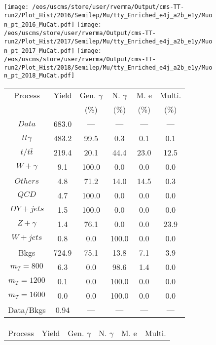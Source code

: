\begin{figure}
\centering
\texttt{[image: /eos/uscms/store/user/rverma/Output/cms-TT-run2/Plot\_Hist/2016/Semilep/Mu/tty\_Enriched\_e4j\_a2b\_e1y/Muon\_pt\_2016\_MuCat.pdf]}
\texttt{[image: /eos/uscms/store/user/rverma/Output/cms-TT-run2/Plot\_Hist/2017/Semilep/Mu/tty\_Enriched\_e4j\_a2b\_e1y/Muon\_pt\_2017\_MuCat.pdf]}
\texttt{[image: /eos/uscms/store/user/rverma/Output/cms-TT-run2/Plot\_Hist/2018/Semilep/Mu/tty\_Enriched\_e4j\_a2b\_e1y/Muon\_pt\_2018\_MuCat.pdf]}
\begin{minipage}[c]{0.32\textwidth}
\centering
\tiny{
\begin{tabular}{cccccc}
\hline
Process & Yield & Gen. $\gamma$ & N. $\gamma$ & M. e & Multi. \\
 &  & (\%) & (\%) & (\%) & (\%)  \\
\hline
                                                                      $ Data $ &  683.0 &  --- &  --- &  --- &  ---\\
$ t\bar{t}\gamma $ &  483.2 &  99.5 &  0.3 &  0.1 &  0.1\\
$ t/t\bar{t} $ &  219.4 &  20.1 &  44.4 &  23.0 &  12.5\\
$ W+\gamma $ &  9.1 &  100.0 &  0.0 &  0.0 &  0.0\\
$ Others $ &  4.8 &  71.2 &  14.0 &  14.5 &  0.3\\
$ QCD $ &  4.7 &  100.0 &  0.0 &  0.0 &  0.0\\
$ DY+jets $ &  1.5 &  100.0 &  0.0 &  0.0 &  0.0\\
$ Z+\gamma $ &  1.4 &  76.1 &  0.0 &  0.0 &  23.9\\
$ W+jets $ &  0.8 &  0.0 &  100.0 &  0.0 &  0.0\\
Bkgs &  724.9 &  75.1 &  13.8 &  7.1 &  3.9\\
$ m_{T} = 800 $ &  6.3 &  0.0 &  98.6 &  1.4 &  0.0\\
$ m_{T} = 1200 $ &  0.1 &  0.0 &  100.0 &  0.0 &  0.0\\
$ m_{T} = 1600 $ &  0.0 &  0.0 &  100.0 &  0.0 &  0.0\\
Data/Bkgs &  0.94 &  --- &  --- &  --- &  ---\\
\hline
\end{tabular}
}
\end{minipage}
\begin{minipage}[c]{0.32\textwidth}
\centering
\tiny{
\begin{tabular}{cccccc}
\hline
Process & Yield & Gen. $\gamma$ & N. $\gamma$ & M. e & Multi. \\

\end{tabular}}
\end{minipage}
\end{figure}
